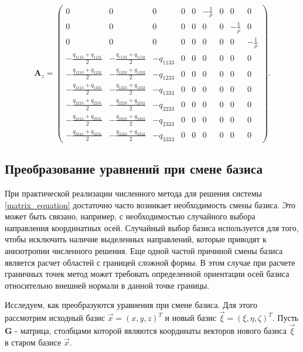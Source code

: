 \begin{displaymath}
\mathbf{A}_z =
\left( \begin{array}{cccccccccccc}
0 & 0 & 0 & 0 & 0 & -\frac 1 \rho & 0 & 0 & 0 \\ 
0 & 0 & 0 & 0 & 0 & 0 & 0 & -\frac 1 \rho & 0 \\ 
0 & 0 & 0 & 0 & 0 & 0 & 0 & 0 & -\frac 1 \rho \\ 
-\frac{q_{1113}+q_{1131}}{2} & -\frac{q_{1123}+q_{1132}}{2} & -q_{1133} & 0 & 0 & 0 & 0 & 0 & 0 \\ 
-\frac{q_{1213}+q_{1231}}{2} & -\frac{q_{1223}+q_{1232}}{2} & -q_{1233} & 0 & 0 & 0 & 0 & 0 & 0 \\ 
-\frac{q_{1313}+q_{1331}}{2} & -\frac{q_{1323}+q_{1332}}{2} & -q_{1333} & 0 & 0 & 0 & 0 & 0 & 0 \\ 
-\frac{q_{2213}+q_{2231}}{2} & -\frac{q_{2223}+q_{2232}}{2} & -q_{2233} & 0 & 0 & 0 & 0 & 0 & 0 \\ 
-\frac{q_{2313}+q_{2331}}{2} & -\frac{q_{2323}+q_{2332}}{2} & -q_{2333} & 0 & 0 & 0 & 0 & 0 & 0 \\ 
-\frac{q_{3313}+q_{3331}}{2} & -\frac{q_{3323}+q_{3332}}{2} & -q_{3333} & 0 & 0 & 0 & 0 & 0 & 0  
\end{array} \right).
\end{displaymath}


\clearpage
\newpage

\subsection{Преобразование уравнений при смене базиса}

При практической реализации численного метода для решения системы \ref{matrix_equation} достаточно часто возникает необходимость смены базиса. Это может быть связано, например, с необходимостью случайного выбора направления координатных осей. Случайный выбор базиса используется для того, чтобы исключить наличие выделенных направлений, которые приводят к анизотропии численного решения. Еще одной частой причиной смены базиса является расчет областей с границей сложной формы. В этом случае при расчете граничных точек метод может требовать определенной ориентации осей базиса относительно внешней нормали в данной точке границы.

Исследуем, как преобразуются уравнения при смене базиса. Для этого рассмотрим исходный базис $\vec x = (x, y, z)^T$ и новый базис $\vec \xi = (\xi, \eta, \zeta)^T$. Пусть $\mathbf G$ - матрица, столбцами которой являются координаты векторов нового базиса $\vec \xi$ в старом базисе $\vec x$.

